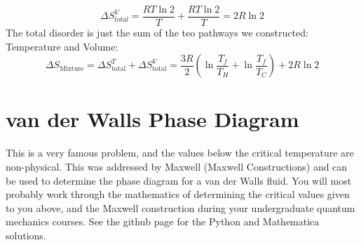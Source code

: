 \documentclass{article}
\newcommand{\be}{\begin{equation}}
\newcommand{\ee}{\end{equation}}
\begin{document}
\be
\Delta S^V_{total} = \frac{RT \ln 2}{T} + \frac{RT \ln 2}{T} = 2R \ln 2
\ee
The total disorder is just the sum of the teo pathways we constructed: Temperature and Volume: 
\be
\Delta S_{\text{Mixture}} = \Delta S^T_{\text{total}} + \Delta S^V_{\text{total}} = \frac{3R}{2} (\ln\frac{T_f}{T_H} + \ln\frac{T_f}{T_C}) + 2R \ln 2
\ee

\section{van der Walls Phase Diagram}
This is a very famous problem, and the values below the critical temperature are non-physical.
This was addressed by Maxwell (Maxwell Constructions) and can be used to determine the phase diagram for a van der Walls fluid. 
You will most probably work through the mathematics of determining the critical values given to you above, and the Maxwell construction during your undergraduate quantum mechanics courses. 
See the github page for the Python and Mathematica solutions. 
\end{document}
